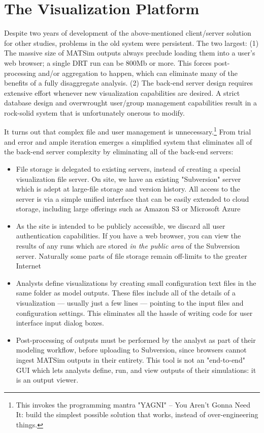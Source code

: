 \section{The Visualization Platform}
\label{avov-platform}

Despite two years of development of the above-mentioned client/server solution for other studies, problems in the old system were persistent. The two largest: (1) The massive size of MATSim outputs always preclude loading them into a user's web browser; a single DRT run can be 800Mb or more. This forces post-processing and/or aggregation to happen, which can eliminate many of the benefits of a fully disaggregate analysis. (2) The back-end server design requires extensive effort whenever new visualization capabilities are desired. A strict database design and overwrought user/group management capabilities result in a rock-solid system that is unfortunately onerous to modify.

It turns out that complex file and user management is unnecessary.\footnote{This invokes the programming mantra "YAGNI" -- You Aren't Gonna Need It: build the simplest possible solution that works, instead of over-engineering things.} From trial and error and ample iteration emerges a simplified system that eliminates all of the back-end server complexity by eliminating all of the back-end servers:

\begin{itemize}
  \item File storage is delegated to existing servers, instead of creating a special visualization file server. On site, we have an existing "Subversion" server \cite{Fitzpatrick2004Subversion} which is adept at large-file storage and version history. All access to the server is via a simple unified interface that can be easily extended to cloud storage, including large offerings such as Amazon S3 or Microsoft Azure
  \item As the site is intended to be publicly accessible, we discard all user authentication capabilities. If you have a web browser, you can view the results of any runs which are stored \emph{in the public area} of the Subversion server. Naturally some parts of file storage remain off-limits to the greater Internet
  \item Analysts define visualizations by creating small configuration text files in the same folder as model outputs. These files include all of the details of a visualization --- usually just a few lines --- pointing to the input files and configuration settings. This eliminates all the hassle of writing code for user interface input dialog boxes.
  \item Post-processing of outputs must be performed by the analyst as part of their modeling workflow, before uploading to Subversion, since browsers cannot ingest MATSim outputs in their entirety. This tool is not an "end-to-end" GUI which lets analysts define, run, and view outputs of their simulations: it is an output viewer.
\end{itemize}

